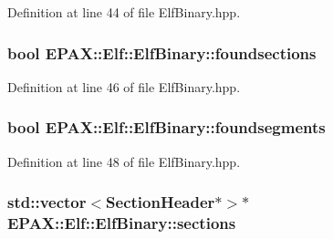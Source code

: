 \-Definition at line 44 of file \-Elf\-Binary.\-hpp.

\hypertarget{class_e_p_a_x_1_1_elf_1_1_elf_binary_a0fff68c4ab05d176acf716fc878a20ab}{
\subsubsection[{foundsections}]{\setlength{\rightskip}{0pt plus 5cm}bool {\bf \-E\-P\-A\-X\-::\-Elf\-::\-Elf\-Binary\-::foundsections}}}\label{class_e_p_a_x_1_1_elf_1_1_elf_binary_a0fff68c4ab05d176acf716fc878a20ab}


\-Definition at line 46 of file \-Elf\-Binary.\-hpp.

\hypertarget{class_e_p_a_x_1_1_elf_1_1_elf_binary_a07d9f4abb56b2522a17f6db39373a53a}{
\subsubsection[{foundsegments}]{\setlength{\rightskip}{0pt plus 5cm}bool {\bf \-E\-P\-A\-X\-::\-Elf\-::\-Elf\-Binary\-::foundsegments}}}\label{class_e_p_a_x_1_1_elf_1_1_elf_binary_a07d9f4abb56b2522a17f6db39373a53a}


\-Definition at line 48 of file \-Elf\-Binary.\-hpp.

\hypertarget{class_e_p_a_x_1_1_elf_1_1_elf_binary_afbb96059b56ec958d3901a1562343224}{
\subsubsection[{sections}]{\setlength{\rightskip}{0pt plus 5cm}std\-::vector$<${\bf \-Section\-Header}$\ast$$>$$\ast$ {\bf \-E\-P\-A\-X\-::\-Elf\-::\-Elf\-Binary\-::sections}}}\label{class_e_p_a_x_1_1_elf_1_1_elf_binary_afbb96059b56ec958d3901a1562343224}


